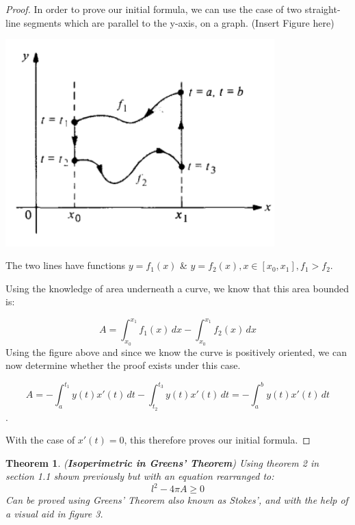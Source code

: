 \documentclass[a4paper]{book}
\newtheorem{theorem}{Theorem}%
\begin{document}
\begin{proof} 
    In order to prove our initial formula, we can use the case of two straight-line segments which are parallel to the y-axis, on a graph. (Insert Figure here)

    \begin{center}
	\includegraphics[height=80mm]{Initial Formula Proof Graph.png}
    \end{center}

    The two lines have functions $y=f_1(x)$ \& $y=f_2(x), x\in[x_0,x_1], f_1>f_2$.

    Using the knowledge of area underneath a curve, we know that this area bounded is:

    \[ A =\int_{x_0}^{x_1} f_1(x) \, dx - \int_{x_0}^{x_1} f_2(x) \, dx \]
    Using the figure above and since we know the curve is positively oriented, we can now determine whether the proof exists under this case.

    \[ A =-\int_{a}^{t_1} y(t)x'(t) \, dt - \int_{t_2}^{t_3} y(t)x'(t) \, dt = -\int_{a}^{b} y(t)x'(t) \, dt \].

    With the case of $x'(t)=0$, this therefore proves our initial formula.  
\end{proof}

\begin{theorem}(\textbf{Isoperimetric in Greens' Theorem})
    Using theorem 2 in section 1.1 shown previously but with an equation rearranged to:
    \[l^2 -4\pi A\geqslant 0\]
    Can be proved using Greens' Theorem also known as Stokes', and with the help of a visual aid in figure 3.
\end{theorem}
\end{document}
